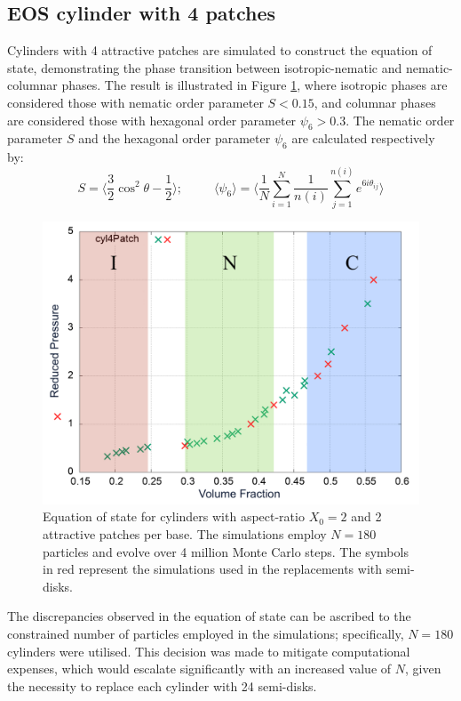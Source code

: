 \documentclass[aip,jcp, amsmath, amssymb, reprint]{revtex4-1}
\begin{document}
\subsection{EOS cylinder with 4 patches}
Cylinders with 4 attractive patches are simulated to construct the equation of state, demonstrating the phase transition between isotropic-nematic and nematic-columnar phases. The result is illustrated in Figure \ref{fig:eos1}, where isotropic phases are considered those with nematic order parameter $S<0.15$, and columnar phases are considered those with hexagonal order parameter $\psi_6 > 0.3$. The nematic order parameter $S$ and the hexagonal order parameter $\psi_6 $ are calculated respectively by: 
\begin{equation}  
\label{pordnem}
S= \bigg\langle \frac{3}{2} \cos^2\theta - \frac{1}{2} \bigg\rangle; \; \; \; \; \; \; \; \; \; \langle \psi_6\rangle=\bigg\langle \frac{1}{N} \sum_{i=1}^N \frac{1}{n(i)} \sum_{j=1}^{n(i)}e^{6i\theta_{ij}} \bigg\rangle
\end{equation}


\begin{figure}[h!]
\includegraphics[width=0.86\linewidth]{eos.png}
\caption{\label{fig:eos1} Equation of state for cylinders with aspect-ratio $X_0=2$ and 2 attractive patches per base. The simulations employ $N = 180$ particles and evolve over 4 million Monte Carlo steps. The symbols in red represent the simulations used in the replacements with semi-disks.}
\end{figure}


The discrepancies observed in the equation of state can be ascribed to the constrained number of particles employed in the simulations; specifically, $N=180$ cylinders were utilised. This decision was made to mitigate computational expenses, which would escalate significantly with an increased value of $N$, given the necessity to replace each cylinder with 24 semi-disks.
\end{document}
